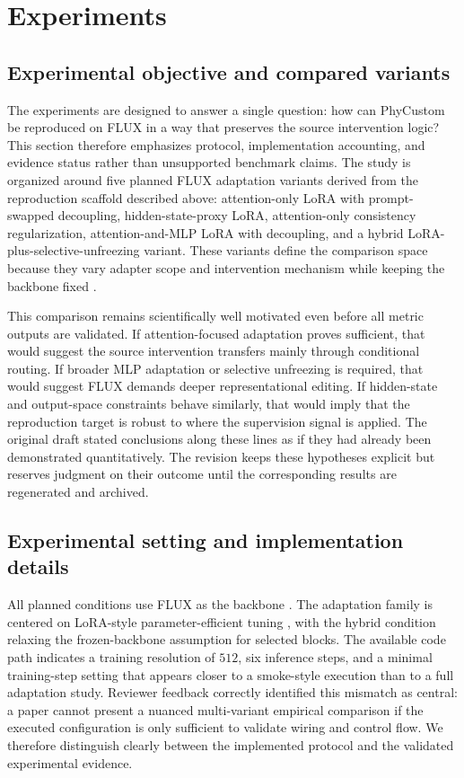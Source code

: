 \documentclass{article}
\begin{document}
\section{Experiments}

\subsection{Experimental objective and compared variants}

The experiments are designed to answer a single question: how can PhyCustom be reproduced on FLUX in a way that preserves the source intervention logic? This section therefore emphasizes protocol, implementation accounting, and evidence status rather than unsupported benchmark claims. The study is organized around five planned FLUX adaptation variants derived from the reproduction scaffold described above: attention-only LoRA with prompt-swapped decoupling, hidden-state-proxy LoRA, attention-only consistency regularization, attention-and-MLP LoRA with decoupling, and a hybrid LoRA-plus-selective-unfreezing variant. These variants define the comparison space because they vary adapter scope and intervention mechanism while keeping the backbone fixed \cite{hu2021lora,blackforestlabs2024fluxdev}.

This comparison remains scientifically well motivated even before all metric outputs are validated. If attention-focused adaptation proves sufficient, that would suggest the source intervention transfers mainly through conditional routing. If broader MLP adaptation or selective unfreezing is required, that would suggest FLUX demands deeper representational editing. If hidden-state and output-space constraints behave similarly, that would imply that the reproduction target is robust to where the supervision signal is applied. The original draft stated conclusions along these lines as if they had already been demonstrated quantitatively. The revision keeps these hypotheses explicit but reserves judgment on their outcome until the corresponding results are regenerated and archived.

\subsection{Experimental setting and implementation details}

All planned conditions use FLUX as the backbone \cite{blackforestlabs2024fluxdev}. The adaptation family is centered on LoRA-style parameter-efficient tuning \cite{hu2021lora}, with the hybrid condition relaxing the frozen-backbone assumption for selected blocks. The available code path indicates a training resolution of \(512\), six inference steps, and a minimal training-step setting that appears closer to a smoke-style execution than to a full adaptation study. Reviewer feedback correctly identified this mismatch as central: a paper cannot present a nuanced multi-variant empirical comparison if the executed configuration is only sufficient to validate wiring and control flow. We therefore distinguish clearly between the implemented protocol and the validated experimental evidence.
\end{document}
